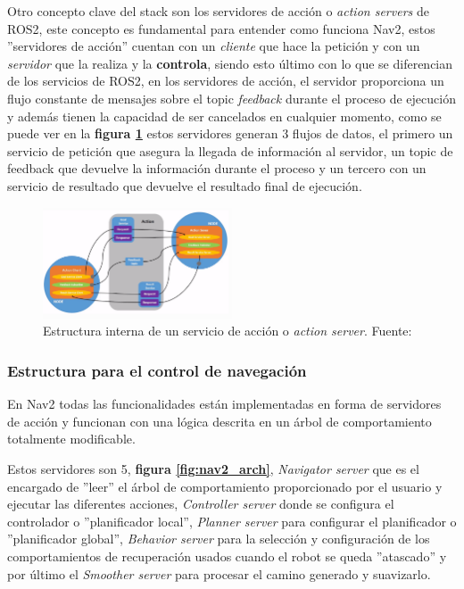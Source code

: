 Otro concepto clave del stack son los servidores de acción o \textit{action servers} de ROS2, este concepto es fundamental para entender como funciona 
Nav2, estos ''servidores de acción'' cuentan con un \textit{cliente} que hace la petición y con un \textit{servidor} que la realiza y la \textbf{controla}, siendo esto último 
con lo que se diferencian de los servicios de ROS2, en los servidores de acción, el servidor proporciona un flujo constante de mensajes sobre el topic \textit{feedback} 
durante el proceso de ejecución y además tienen la capacidad de ser cancelados en cualquier momento, como se puede ver en la \textbf{figura \ref{fig:servicios_accion}} estos servidores 
generan 3 flujos de datos, el primero un servicio de petición que asegura la llegada de información al servidor, un topic de feedback que devuelve la información durante el proceso y 
un tercero con un servicio de resultado que devuelve el resultado final de ejecución.

\begin{figure}[h]
    \centering
    \includegraphics[width=0.5\textwidth]{images/action_server.png}
    \caption{Estructura interna de un servicio de acción o \textit{action server}. Fuente: \cite{ros2}}
    \label{fig:servicios_accion}
\end{figure}

\subsubsection{Estructura para el control de navegación}

En Nav2 todas las funcionalidades están implementadas en forma de servidores de acción y funcionan con una lógica descrita en un árbol de 
comportamiento totalmente modificable.

Estos servidores son 5, \textbf{figura \ref{fig:nav2_arch}}, \textit{Navigator server} que es el encargado de ''leer'' el árbol de comportamiento proporcionado por el usuario y ejecutar las 
diferentes acciones, \textit{Controller server} donde se configura el controlador o ''planificador local'', \textit{Planner server} para configurar 
el planificador o ''planificador global'', \textit{Behavior server} para la selección y configuración de los comportamientos de recuperación 
usados cuando el robot se queda ''atascado'' y por último el \textit{Smoother server} para procesar el camino generado y suavizarlo.

